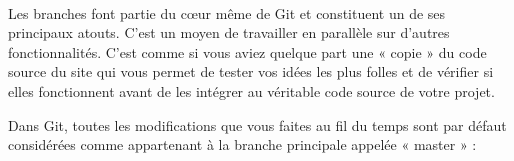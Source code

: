 \documentclass[french, a4paper, 12pt, titlepage]{article}
\begin{document}
\paragraph{}Les branches font partie du cœur même de Git et constituent un de ses principaux atouts. C’est un moyen de travailler en parallèle sur d’autres fonctionnalités. C’est comme si vous aviez quelque part une « copie » du code source du site qui vous permet de tester vos idées les plus folles et de vérifier si elles fonctionnent avant de les intégrer au véritable code source de votre projet.

Dans Git, toutes les modifications que vous faites au fil du temps sont par défaut considérées comme appartenant à la branche principale appelée « master » :


%
%
\end{document}
